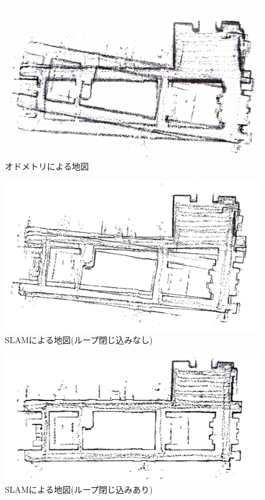 \begin{figure}[h]
  \begin{center}
  \includegraphics[width=.8\linewidth]{img/slam_2.pdf}
  \caption{オドメトリによる地図\cite{slam:nyumon}}
  \label{slam:odometry}
  \end{center}
\end{figure}

\begin{figure}[h]
  \begin{center}
  \includegraphics[width=.8\linewidth]{img/slam_3.pdf}
  \caption{SLAMによる地図(ループ閉じ込みなし)\cite{slam:nyumon}}
  \label{slam:slam}
  \end{center}
\end{figure}

\begin{figure}[h]
  \begin{center}
  \includegraphics[width=.8\linewidth]{img/slam_4.pdf}
  \caption{SLAMによる地図(ループ閉じ込みあり)\cite{slam:nyumon}}
  \label{slam:slam_loop}
  \end{center}
\end{figure}


